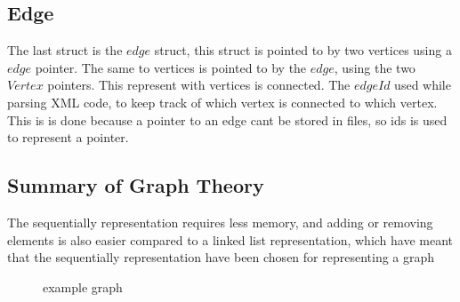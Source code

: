 \begin{minipage}{\linewidth}
\subsection{Edge}
The last struct is the $edge$ struct, this struct is pointed to by two vertices using a $edge$ pointer. The same to vertices is pointed to by the $edge$, using the two $Vertex$ pointers. This represent with vertices is connected.
The $edgeId$ used while parsing XML code, to keep track of which vertex is connected to which vertex.
This is is done because a pointer to an edge cant be stored in files, so ids is used to represent a pointer. 
 \label{edge_struct}
\end{minipage}


\subsection{Summary of Graph Theory}


The sequentially representation requires less memory, and adding or removing elements is also easier compared to a linked list representation, which have meant that the sequentially representation have been chosen for representing a graph 


\begin{figure}[h]
\centering
{}
\caption{example graph} \label{fig:examplegraph}
\end{figure}
